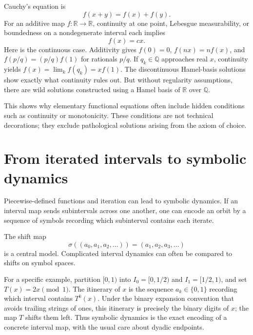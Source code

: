 Cauchy's equation is
\[
  f(x+y)=f(x)+f(y).
\]
For an additive map \(f:\mathbb R\to\mathbb R\), continuity at one point, Lebesgue measurability, or boundedness on a nondegenerate interval each implies
\[
  f(x)=cx.
\]
Here is the continuous case. Additivity gives \(f(0)=0\), \(f(nx)=nf(x)\), and \(f(p/q)=(p/q)f(1)\) for rationals \(p/q\). If \(q_k\in\mathbb Q\) approaches real \(x\), continuity yields \(f(x)=\lim_k f(q_k)=x f(1)\). The discontinuous Hamel-basis solutions show exactly what continuity rules out.
But without regularity assumptions, there are wild solutions constructed using a Hamel basis of $\mathbb R$ over $\mathbb Q$.

This shows why elementary functional equations often include hidden conditions such as continuity or monotonicity.  These conditions are not technical decorations; they exclude pathological solutions arising from the axiom of choice.

\section{From iterated intervals to symbolic dynamics}

Piecewise-defined functions and iteration can lead to symbolic dynamics.  If an interval map sends subintervals across one another, one can encode an orbit by a sequence of symbols recording which subinterval contains each iterate.

The shift map
\[
  \sigma((a_0,a_1,a_2,\ldots))=(a_1,a_2,a_3,\ldots)
\]
is a central model.  Complicated interval dynamics can often be compared to shifts on symbol spaces.

For a specific example, partition \([0,1)\) into \(I_0=[0,1/2)\) and \(I_1=[1/2,1)\), and set \(T(x)=2x\pmod1\). The itinerary of \(x\) is the sequence \(a_k\in\{0,1\}\) recording which interval contains \(T^k(x)\). Under the binary expansion convention that avoids trailing strings of ones, this itinerary is precisely the binary digits of \(x\); the map \(T\) shifts them left. Thus symbolic dynamics is the exact encoding of a concrete interval map, with the usual care about dyadic endpoints.
